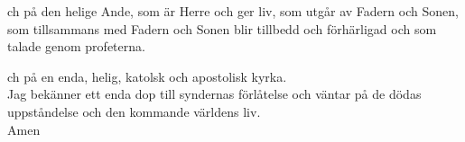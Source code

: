 {ch på den helige Ande, som är Herre och ger liv,
som utgår av Fadern och Sonen,
som tillsammans med Fadern och Sonen
blir tillbedd och förhärligad
och som talade genom profeterna.}

{ch på en enda, helig, katolsk och apostolisk kyrka.\\
Jag bekänner ett enda dop till syndernas förlåtelse
och väntar på de dödas uppståndelse
och den kommande värld\-ens liv.\\
Amen}
